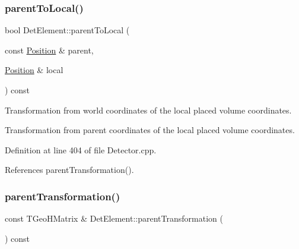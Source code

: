 \hypertarget{class_d_d4hep_1_1_geometry_1_1_det_element_a3203b4eaeb057b4ffbe0566626141af3}{}\label{class_d_d4hep_1_1_geometry_1_1_det_element_a3203b4eaeb057b4ffbe0566626141af3} 
\subsubsection{\texorpdfstring{parent\+To\+Local()}{parentToLocal()}}
{\footnotesize\ttfamily bool Det\+Element\+::parent\+To\+Local (\begin{DoxyParamCaption}\item[{const \hyperlink{namespace_d_d4hep_1_1_geometry_a55083902099d03506c6db01b80404900}{Position} \&}]{parent,  }\item[{\hyperlink{namespace_d_d4hep_1_1_geometry_a55083902099d03506c6db01b80404900}{Position} \&}]{local }\end{DoxyParamCaption}) const}



Transformation from world coordinates of the local placed volume coordinates. 

Transformation from parent coordinates of the local placed volume coordinates. 

Definition at line 404 of file Detector.\+cpp.



References parent\+Transformation().

\hypertarget{class_d_d4hep_1_1_geometry_1_1_det_element_a0d916c1f8d25cfc4e4b38bb44b4dc2d2}{}\label{class_d_d4hep_1_1_geometry_1_1_det_element_a0d916c1f8d25cfc4e4b38bb44b4dc2d2} 
\subsubsection{\texorpdfstring{parent\+Transformation()}{parentTransformation()}}
{\footnotesize\ttfamily const T\+Geo\+H\+Matrix \& Det\+Element\+::parent\+Transformation (\begin{DoxyParamCaption}{ }\end{DoxyParamCaption}) const}



